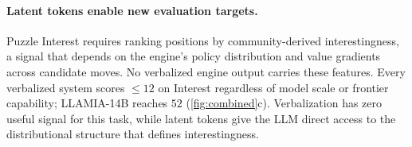 \paragraph{Latent tokens enable new evaluation targets.}
Puzzle Interest requires ranking positions by community-derived interestingness, a signal that depends on the engine's policy distribution and value gradients across candidate moves.
No verbalized engine output carries these features.
Every verbalized system scores ${\leq}12$ on Interest regardless of model scale or frontier capability; LLAMIA-14B reaches $52$ (\cref{fig:combined}c).
Verbalization has zero useful signal for this task, while latent tokens give the LLM direct access to the distributional structure that defines interestingness.



